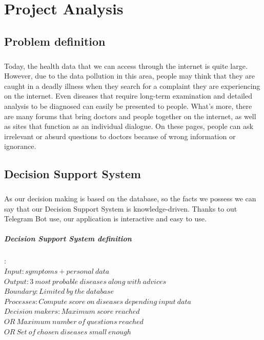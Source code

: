 \chapter{Project Analysis} 

\section{Problem definition}

\paragraph{}
Today, the health data that we can access through the internet is quite large. However, due to the data pollution in this area, people may think that they are	caught	in	a	deadly	illness when	they	search	for	a	complaint	they	are	experiencing	on	the	internet.	Even	diseases	that require	long-term	examination	and	detailed	analysis	to	be	diagnosed	can	easily	be	presented to	people.	What's	more,	there	are	many	forums	that	bring	doctors	and	people	together	on	the	internet,	as	well	as	sites	that	function	as	an	individual	dialogue.	On	these	pages,	people	can	ask	irrelevant	or	absurd	questions	to	doctors	because	of	wrong	information	or	ignorance. 

\section{Decision Support System}

\paragraph{}
As our decision making is based on the database, so the facts we possess we can say that our Decision Support System is knowledge-driven. Thanks to out Telegram Bot use, our application is interactive and easy to use.

\paragraph{Decision Support System definition}:\\
$Input: symptoms + personal\ data$\\
$Output: 3\ most\ probable\ diseases\ along\ with\ advices$\\
$Boundary: Limited\ by\ the\ database$\\
$Processes: Compute\ score\ on\ diseases\ depending\ input\ data$\\
$Decision\ makers: Maximum\ score\ reached$\\
$OR\ Maximum\ number\ of\ questions\ reached$\\
$OR\ Set\ of\ chosen\ diseases\ small\ enough$\\


